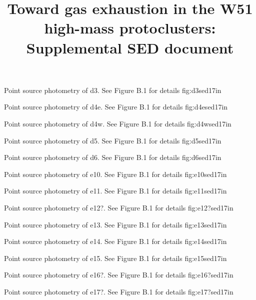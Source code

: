 



\title{Toward gas exhaustion in the W51 high-mass protoclusters: Supplemental SED document}


{Point source photometry of d3.  See Figure B.1 for
details}
{fig:d3sed}{1}{7in}
\clearpage

{Point source photometry of d4e.  See Figure B.1 for
details}
{fig:d4esed}{1}{7in}
\clearpage

{Point source photometry of d4w.  See Figure B.1 for
details}
{fig:d4wsed}{1}{7in}
\clearpage

{Point source photometry of d5.  See Figure B.1 for
details}
{fig:d5sed}{1}{7in}
\clearpage

{Point source photometry of d6.  See Figure B.1 for
details}
{fig:d6sed}{1}{7in}
\clearpage

{Point source photometry of e10.  See Figure B.1 for
details}
{fig:e10sed}{1}{7in}
\clearpage

{Point source photometry of e11.  See Figure B.1 for
details}
{fig:e11sed}{1}{7in}
\clearpage

{Point source photometry of e12?.  See Figure B.1 for
details}
{fig:e12?sed}{1}{7in}
\clearpage

{Point source photometry of e13.  See Figure B.1 for
details}
{fig:e13sed}{1}{7in}
\clearpage

{Point source photometry of e14.  See Figure B.1 for
details}
{fig:e14sed}{1}{7in}
\clearpage

{Point source photometry of e15.  See Figure B.1 for
details}
{fig:e15sed}{1}{7in}
\clearpage

{Point source photometry of e16?.  See Figure B.1 for
details}
{fig:e16?sed}{1}{7in}
\clearpage

{Point source photometry of e17?.  See Figure B.1 for
details}
{fig:e17?sed}{1}{7in}
\clearpage

